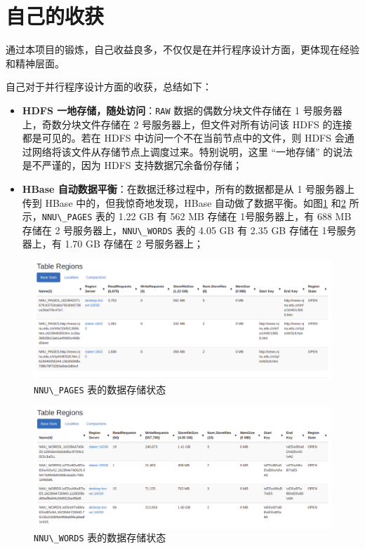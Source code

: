 \documentclass{ctexart}
\newcommand{\code}[1]{\colorbox{backcolor}{\lstinline|#1|}}
\begin{document}
    \section{自己的收获}\label{sec:achievement}

    通过本项目的锻炼，自己收益良多，不仅仅是在并行程序设计方面，更体现在经验和精神层面。

    自己对于并行程序设计方面的收获，总结如下：

    \begin{itemize}
        \item \textbf{HDFS 一地存储，随处访问}：\code{RAW} 数据的偶数分块文件存储在 1 号服务器上，奇数分块文件存储在 2 号服务器上，但文件对所有访问该 HDFS 的连接都是可见的。若在 HDFS 中访问一个不在当前节点中的文件，则 HDFS 会通过网络将该文件从存储节点上调度过来。特别说明，这里 “一地存储” 的说法是不严谨的，因为 HDFS 支持数据冗余备份存储；
        \item \textbf{HBase 自动数据平衡}：在数据迁移过程中，所有的数据都是从 1 号服务器上传到 HBase 中的，但我惊奇地发现，HBase 自动做了数据平衡。如图\ref{fig:achievement_nnu-pages} 和\ref{fig:achievement_nnu-words} 所示，\code{NNU\_PAGES} 表的 1.22 GB 有 562 MB 存储在 1号服务器上，有 688 MB 存储在 2 号服务器上，\code{NNU\_WORDS} 表的 4.05 GB 有 2.35 GB 存储在 1号服务器上，有 1.70 GB 存储在 2 号服务器上；
    \end{itemize}

    \begin{figure}[!h]
        \centering
        \includegraphics[width=\textwidth]{src/achievement_nnu-pages}
        \caption{\code{NNU\_PAGES} 表的数据存储状态}
        \label{fig:achievement_nnu-pages}
    \end{figure}

    \begin{figure}[!h]
        \centering
        \includegraphics[width=\textwidth]{src/achievement_nnu-words}
        \caption{\code{NNU\_WORDS} 表的数据存储状态}
        \label{fig:achievement_nnu-words}
    \end{figure}
\end{document}
